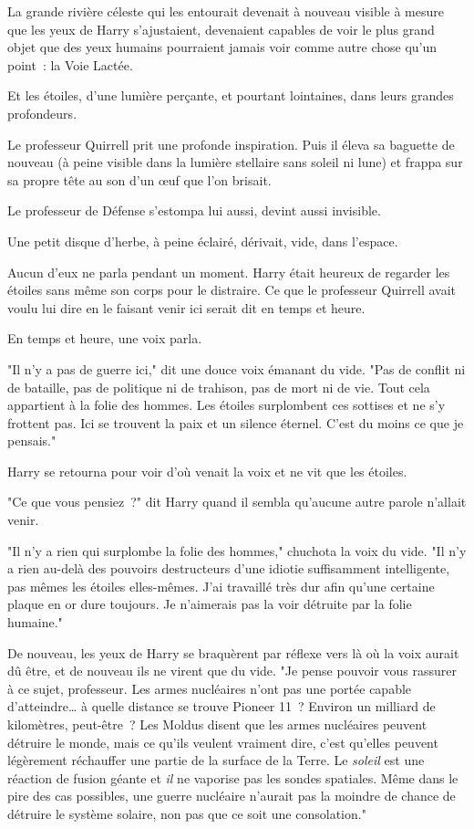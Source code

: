 La grande rivière céleste qui les entourait devenait à nouveau visible à mesure que les yeux de Harry s'ajustaient, devenaient capables de voir le plus grand objet que des yeux humains pourraient jamais voir comme autre chose qu'un point~: la Voie Lactée.

Et les étoiles, d'une lumière perçante, et pourtant lointaines, dans leurs grandes profondeurs.

Le professeur Quirrell prit une profonde inspiration. Puis il éleva sa baguette de nouveau (à peine visible dans la lumière stellaire sans soleil ni lune) et frappa sur sa propre tête au son d'un œuf que l'on brisait.

Le professeur de Défense s'estompa lui aussi, devint aussi invisible.

Une petit disque d'herbe, à peine éclairé, dérivait, vide, dans l'espace.

Aucun d'eux ne parla pendant un moment. Harry était heureux de regarder les étoiles sans même son corps pour le distraire. Ce que le professeur Quirrell avait voulu lui dire en le faisant venir ici serait dit en temps et heure.

En temps et heure, une voix parla.

"Il n'y a pas de guerre ici," dit une douce voix émanant du vide. "Pas de conflit ni de bataille, pas de politique ni de trahison, pas de mort ni de vie. Tout cela appartient à la folie des hommes. Les étoiles surplombent ces sottises et ne s'y frottent pas. Ici se trouvent la paix et un silence éternel. C'est du moins ce que je pensais."

Harry se retourna pour voir d'où venait la voix et ne vit que les étoiles.

"Ce que vous pensiez~?" dit Harry quand il sembla qu'aucune autre parole n'allait venir.

"Il n'y a rien qui surplombe la folie des hommes," chuchota la voix du vide. "Il n'y a rien au-delà des pouvoirs destructeurs d'une idiotie suffisamment intelligente, pas mêmes les étoiles elles-mêmes. J'ai travaillé très dur afin qu'une certaine plaque en or dure toujours. Je n'aimerais pas la voir détruite par la folie humaine."

De nouveau, les yeux de Harry se braquèrent par réflexe vers là où la voix aurait dû être, et de nouveau ils ne virent que du vide. "Je pense pouvoir vous rassurer à ce sujet, professeur. Les armes nucléaires n'ont pas une portée capable d'atteindre… à quelle distance se trouve Pioneer 11~? Environ un milliard de kilomètres, peut-être~? Les Moldus disent que les armes nucléaires peuvent détruire le monde, mais ce qu'ils veulent vraiment dire, c'est qu'elles peuvent légèrement réchauffer une partie de la surface de la Terre. Le \emph{soleil} est une réaction de fusion géante et \emph{il} ne vaporise pas les sondes spatiales. Même dans le pire des cas possibles, une guerre nucléaire n'aurait pas la moindre de chance de détruire le système solaire, non pas que ce soit une consolation."


